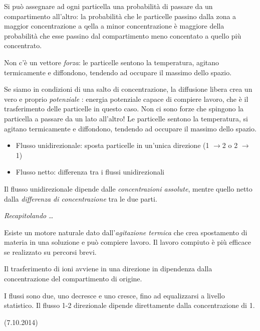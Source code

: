 \documentclass[a4paper,12pt]{article}
\newcommand{\lfreccia}{\ensuremath{\longrightarrow}}
\begin{document}
Si può assegnare ad ogni particella una probabilità di passare da un compartimento all'altro: la probabilità che le particelle passino dalla zona a maggior concentrazione a qella a minor concentrazione è maggiore della probabilità che esse passino dal compartimento meno concentato a quello più concentrato.

Non c'è un vettore \emph{forza}: le particelle sentono la temperatura, agitano termicamente e diffondono, tendendo ad occupare il massimo dello spazio.

Se siamo in condizioni di una salto di concentrazione, la diffusione libera crea un vero e proprio \emph{potenziale} : energia potenziale capace di compiere lavoro, che è il trasferimento delle particelle in questo caso.
Non ci sono forze che spingono la particella a passare da un lato all'altro! Le particelle sentono la temperatura, si agitano termicamente e diffondono, tendendo ad occupare il massimo dello spazio.

\begin{itemize}
\item{Flusso unidirezionale: sposta particelle in un'unica direzione (1 \lfreccia 2 o 2 \lfreccia 1)}
\item{Flusso netto: differenza tra i flussi unidirezionali}
\end{itemize}

Il flusso unidirezionale dipende dalle \emph{concentrazioni assolute}, mentre quello netto dalla \emph{differenza di concentrazione} tra le due parti.

\emph{Recapitolando} \ldots

Esiste un motore naturale dato dall'\emph{agitazione termica} che crea spostamento di materia in una soluzione e può compiere lavoro. Il lavoro compiuto è più efficace se realizzato su percorsi brevi.

Il trasferimento di ioni avviene in una direzione in dipendenza dalla concentrazione del compartimento di origine.

I flussi sono due, uno decresce e uno cresce, fino ad equalizzarsi a livello statistico. Il flusso 1-2 direzionale dipende direttamente dalla concentrazione di 1.

(7.10.2014)
\end{document}
